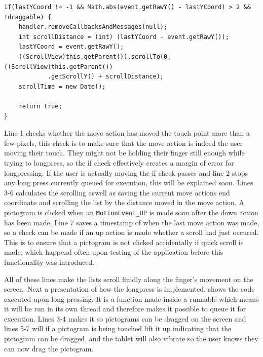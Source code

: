 \begin{lstlisting}[float, floatplacement=h, caption={The code executed when someone performs a move action.}, label={lst:actionmove}] 
if(lastYCoord != -1 && Math.abs(event.getRawY() - lastYCoord) > 2 && !draggable) {
    handler.removeCallbacksAndMessages(null);
    int scrollDistance = (int) (lastYCoord - event.getRawY());
    lastYCoord = event.getRawY();
    ((ScrollView)this.getParent()).scrollTo(0,((ScrollView)this.getParent())
    		.getScrollY() + scrollDistance);
	scrollTime = new Date();

	return true;
}
\end{lstlisting}

Line 1 checks whether the move action has moved the touch point more than a few pixels, this check is to make sure that the move action is indeed the user moving their touch.
They might not be holding their finger still enough while trying to longpress, so the if check effectively creates a margin of error for longpressing.
If the user is actually moving the if check passes and line 2 stops any long press currently queued for execution, this will be explained soon.
Lines 3-6 calculates the scrolling aswell as saving the current move actions end coordinate and scrolling the list by the distance moved in the move action.
A pictogram is clicked when an \texttt{MotionEvent\_UP} is made soon after the down action has been made.
Line 7 saves a timestamp of when the last move action was made, so a check can be made if an up action is made whether a scroll had just occured. 
This is to ensure that a pictogram is not clicked accidentally if quick scroll is made, which happend often upon testing of the application before this functionality was introduced.

All of these lines make the lists scroll fluidly along the finger's movement on the screen.
Next a presentation of how the longpress is implemented.
 shows the code executed upon long pressing.
It is a function made inside a runnable which means it will be run in its own thread and therefore makes it possible to queue it for execution.
Lines 3-4 makes it so pictograms can be dragged on the screen and lines 5-7 will if a pictogram is being touched lift it up indicating that the pictogram can be dragged, and the tablet will also vibrate so the user knows they can now drag the pictogram.

